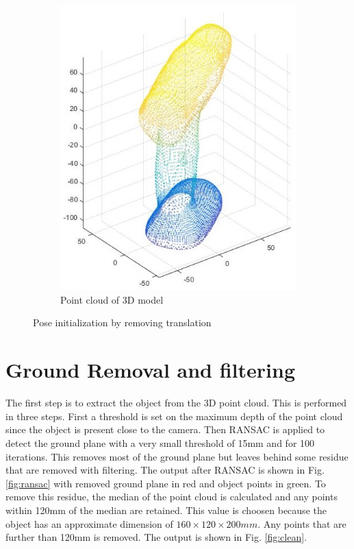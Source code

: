 \documentclass[letterpaper, 10 pt, conference]{ieeeconf}  %
\begin{document}
\begin{figure}
\begin{subfigure}[b]{0.5\textwidth}
	\centering
   \includegraphics[scale =0.35]{model.jpg}
   \caption{Point cloud of 3D model}
   \label{fig:model}
\end{subfigure}
\caption{Pose initialization by removing translation}
\label{fig:data}
\end{figure}

\section{Ground Removal and filtering}
\label{sec:gr}
The first step is to extract the object from the 3D point cloud. This is performed in three steps. First a threshold is set on the maximum depth of the point cloud since the object is present close to the camera. Then RANSAC is applied to detect the ground plane with a very small threshold of 15mm and for 100 iterations. This removes most of the ground plane but leaves behind some residue that are removed with filtering. The output after RANSAC is shown in Fig. \ref{fig:ransac} with removed ground plane in red and object points in green. To remove this residue, the median of the point cloud is calculated and any points within 120mm of the median are retained. This value is choosen because the object has an approximate dimension of $160\times120\times200mm$. Any points that are further than 120mm is removed. The output is shown in Fig. \ref{fig:clean}.
\end{document}
